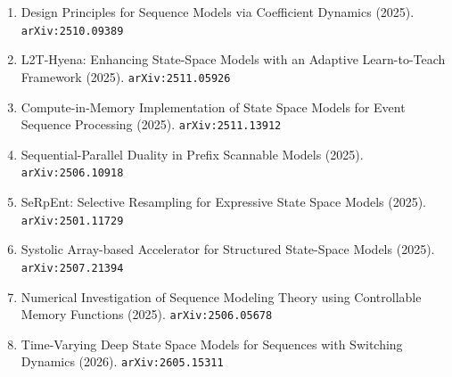\documentclass[11pt]{article}
\begin{document}
\begin{enumerate}
  \item Design Principles for Sequence Models via Coefficient Dynamics (2025). \texttt{arXiv:2510.09389}
  \item L2T-Hyena: Enhancing State-Space Models with an Adaptive Learn-to-Teach Framework (2025). \texttt{arXiv:2511.05926}
  \item Compute-in-Memory Implementation of State Space Models for Event Sequence Processing (2025). \texttt{arXiv:2511.13912}
  \item Sequential-Parallel Duality in Prefix Scannable Models (2025). \texttt{arXiv:2506.10918}
  \item SeRpEnt: Selective Resampling for Expressive State Space Models (2025). \texttt{arXiv:2501.11729}
  \item Systolic Array-based Accelerator for Structured State-Space Models (2025). \texttt{arXiv:2507.21394}
  \item Numerical Investigation of Sequence Modeling Theory using Controllable Memory Functions (2025). \texttt{arXiv:2506.05678}
  \item Time-Varying Deep State Space Models for Sequences with Switching Dynamics (2026). \texttt{arXiv:2605.15311}
\end{enumerate}
\end{document}
